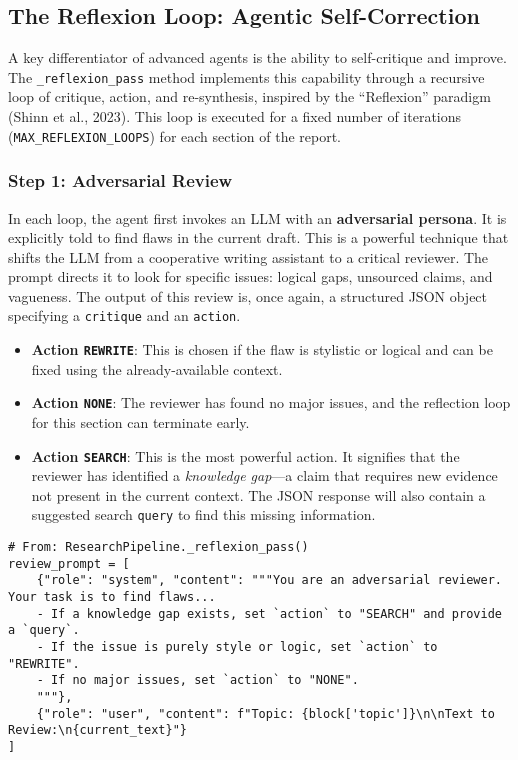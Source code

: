 \documentclass[12pt, a4paper]{article}
\begin{document}
\subsection{The Reflexion Loop: Agentic Self-Correction}
A key differentiator of advanced agents is the ability to self-critique and improve. The \texttt{\_reflexion\_pass} method implements this capability through a recursive loop of critique, action, and re-synthesis, inspired by the ``Reflexion'' paradigm (Shinn et al., 2023). This loop is executed for a fixed number of iterations (\texttt{MAX\_REFLEXION\_LOOPS}) for each section of the report.

\subsubsection{Step 1: Adversarial Review}
In each loop, the agent first invokes an LLM with an \textbf{adversarial persona}. It is explicitly told to find flaws in the current draft. This is a powerful technique that shifts the LLM from a cooperative writing assistant to a critical reviewer. The prompt directs it to look for specific issues: logical gaps, unsourced claims, and vagueness.
The output of this review is, once again, a structured JSON object specifying a \texttt{critique} and an \texttt{action}.
\begin{itemize}
    \item \textbf{Action \texttt{REWRITE}}: This is chosen if the flaw is stylistic or logical and can be fixed using the already-available context.
    \item \textbf{Action \texttt{NONE}}: The reviewer has found no major issues, and the reflection loop for this section can terminate early.
    \item \textbf{Action \texttt{SEARCH}}: This is the most powerful action. It signifies that the reviewer has identified a \emph{knowledge gap}---a claim that requires new evidence not present in the current context. The JSON response will also contain a suggested search \texttt{query} to find this missing information.
\end{itemize}

\begin{lstlisting}[style=myPython, label={The adversarial review prompt}]
# From: ResearchPipeline._reflexion_pass()
review_prompt = [
    {"role": "system", "content": """You are an adversarial reviewer. Your task is to find flaws...
    - If a knowledge gap exists, set `action` to "SEARCH" and provide a `query`.
    - If the issue is purely style or logic, set `action` to "REWRITE".
    - If no major issues, set `action` to "NONE".
    """},
    {"role": "user", "content": f"Topic: {block['topic']}\n\nText to Review:\n{current_text}"}
]
\end{lstlisting}
\end{document}
